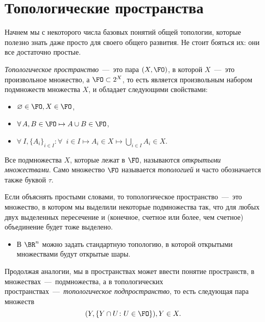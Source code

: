 \section{Топологические пространства}


	Начнем мы с некоторого числа базовых понятий общей топологии, которые полезно знать даже просто для своего общего развития. Не стоит бояться их: они все достаточно простые.
	
\begin{definition}
	\emph{Топологическое пространство}~---~это пара $(X, \FO)$, в которой $X$~---~это произвольное множество, а $\FO \subset 2^{X}$, то есть является произвольным набором подмножеств множества $X$, и обладает следующими свойствами:
	\begin{itemize}
		\item $\varnothing \in \FO, X \in \FO$,
		\item $\forall \!\ A, B \in \FO \mapsto A \cup B \in \FO$,
		\item $\forall \!\ I, \lbrace A_i \rbrace_{i \in I} \colon \forall \;\ i \in I \mapsto A_i \in X \mapsto \bigcup\limits_{i \in I} A_i \in X$.
	\end{itemize}
	Все подмножества $X$, которые лежат в $\FO$, называются \emph{открытыми множествами}. Само множество $\FO$ называется \emph{топологией} и часто обозначается также буквой $\tau$.
\end{definition}

	Если объяснять простыми словами, то топологическое пространство~---~это множество, в котором мы выделили некоторые подмножества так, что для любых двух выделенных пересечение и (конечное, счетное или более, чем счетное) объединение будет тоже выделено.
	
\begin{example}
\begin{itemize}
	\item В $\BR^n$ можно задать стандартную топологию, в которой открытыми множествами будут открытые шары.
\end{itemize}
\end{example}

	Продолжая аналогии, мы в пространствах может ввести понятие пространств, в множествах~---~подмножества, а в топологических пространствах~---~\emph{топологическое подпространство}, то есть следующая пара множеств
	$$(Y, \lbrace Y \cap U \colon U \in \FO \rbrace), Y \in X.$$
	

